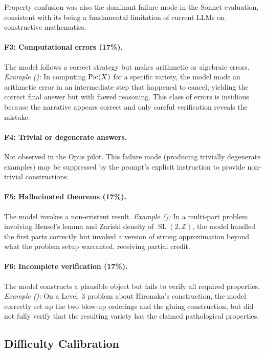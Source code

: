Property confusion was also the dominant failure mode in the Sonnet evaluation, consistent with its being a fundamental limitation of current LLMs on constructive mathematics.

\paragraph{F3: Computational errors (17\%).}
The model follows a correct strategy but makes arithmetic or algebraic errors.
\emph{Example ():} In computing $\operatorname{Pic}(X)$ for a specific variety, the model made an arithmetic error in an intermediate step that happened to cancel, yielding the correct final answer but with flawed reasoning.
This class of errors is insidious because the narrative appears correct and only careful verification reveals the mistake.

\paragraph{F4: Trivial or degenerate answers.}
Not observed in the Opus pilot. This failure mode (producing trivially degenerate examples) may be suppressed by the prompt's explicit instruction to provide non-trivial constructions.

\paragraph{F5: Hallucinated theorems (17\%).}
The model invokes a non-existent result.
\emph{Example ():} In a multi-part problem involving Hensel's lemma and Zariski density of $\operatorname{SL}(2,\mathbb{Z})$, the model handled the first parts correctly but invoked a version of strong approximation beyond what the problem setup warranted, receiving partial credit.

\paragraph{F6: Incomplete verification (17\%).}
The model constructs a plausible object but fails to verify all required properties.
\emph{Example ():} On a Level~3 problem about Hironaka's construction, the model correctly set up the two blow-up orderings and the gluing construction, but did not fully verify that the resulting variety has the claimed pathological properties.

\subsection{Difficulty Calibration}
\label{sec:difficulty-calibration}

